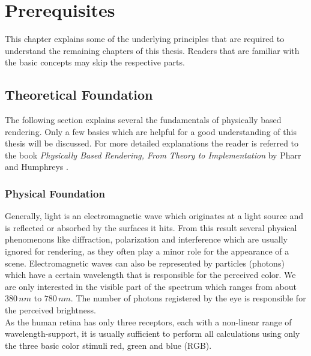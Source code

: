 \documentclass[thesis.tex]{subfiles}
\begin{document}
\chapter{Prerequisites}\label{chap:preq}
This chapter explains some of the underlying principles that are required to understand the remaining chapters of this thesis.
Readers that are familiar with the basic concepts may skip the respective parts.


\section{Theoretical Foundation} \label{sec:preq:theo}
The following section explains several the fundamentals of physically based rendering.
Only a few basics which are helpful for a good understanding of this thesis will be discussed.
For more detailed explanations the reader is referred to the book \emph{Physically Based Rendering, From Theory to Implementation} by Pharr and Humphreys \cite{bib:pbrt}.

\subsection{Physical Foundation}
Generally, light is an electromagnetic wave which originates at a light source and is reflected or absorbed by the surfaces it hits.
From this result several physical phenomenons like diffraction, polarization and interference which are usually ignored for rendering, as they often play a minor role for the appearance of a scene.
Electromagnetic waves can also be represented by particles (photons) which have a certain wavelength that is responsible for the perceived color.
We are only interested in the visible part of the spectrum which ranges from about $380\,nm$ to $780\,nm$.
The number of photons registered by the eye is responsible for the perceived brightness.
\\
As the human retina has only three receptors, each with a non-linear range of wavelength-support, it is usually sufficient to perform all calculations using only the three basic color stimuli red, green and blue \cite{bib:colorscience} (RGB).
\end{document}
